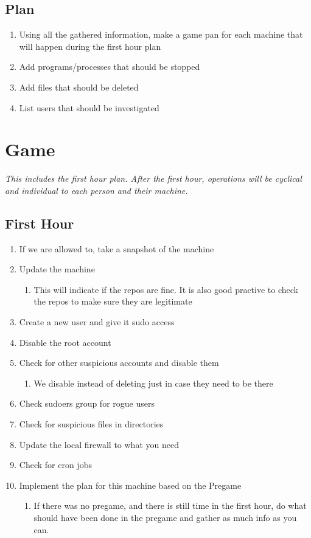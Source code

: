 \documentclass{article}
\begin{document}
\subsection{Plan}
\begin{enumerate}
	\item Using all the gathered information, make a game pan for each machine that will happen during the first hour plan
	\item Add programs/processes that should be stopped
	\item Add files that should be deleted
	\item List users that should be investigated
\end{enumerate}

\section{Game}
\textit{This includes the first hour plan. After the first hour, operations will be cyclical and individual to each person and their machine.}

\subsection{First Hour}
\begin{enumerate}
	\item If we are allowed to, take a snapshot of the machine
	\item Update the machine
	\begin{enumerate}
		\item This will indicate if the repos are fine. It is also good practive to check the repos to make sure they are legitimate
	\end{enumerate}
	\item Create a new user and give it sudo access
	\item Disable the root account
	\item Check for other suspicious accounts and disable them
	\begin{enumerate}
		\item We disable instead of deleting just in case they need to be there
	\end{enumerate}
	\item Check sudoers group for rogue users
	\item Check for suspicious files in directories
	\item Update the local firewall to what you need
	\item Check for cron jobs
	\item Implement the plan for this machine based on the Pregame
	\begin{enumerate}
		\item If there was no pregame, and there is still time in the first hour, do what should have been done in the pregame and gather as much info as you can.
	\end{enumerate}
\end{enumerate}
\end{document}
